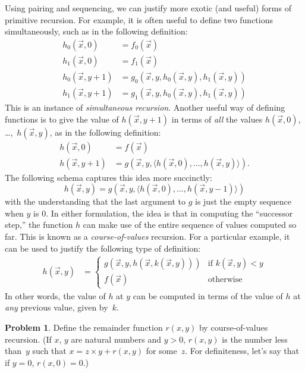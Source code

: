 \documentclass[10pt,a4paper]{article}
\theoremstyle{plain}
\theoremstyle{definition}
\newtheorem{prob}{Problem}[section]
\theoremstyle{remark}
\providecommand{\tuple}[1]{\langle #1 \rangle}
\begin{document}
Using pairing and sequencing, we can justify more exotic (and
useful) forms of primitive recursion. For example, it is often useful
to define two functions simultaneously, such as in the following
definition:
\begin{align*}
h_0(\vec x, 0) & = f_0(\vec x) \\
h_1(\vec x, 0) & = f_1(\vec x) \\
h_0(\vec x, y+1) & = g_0(\vec x, y, h_0(\vec x, y), h_1(\vec x, y)) \\
h_1(\vec x, y+1) & = g_1(\vec x, y, h_0(\vec x, y), h_1(\vec x, y))
\end{align*}
This is an instance of \emph{simultaneous recursion}. Another useful
way of defining functions is to give the value of $h(\vec x, y+1)$ in
terms of \emph{all} the values $h(\vec x, 0)$, \dots,~$h(\vec x, y)$, as in
the following definition:
\begin{align*}
h(\vec x, 0) & = f(\vec x) \\
h(\vec x, y+1) & = g(\vec x, y, \tuple{h(\vec x, 0), \dots, h(\vec x, y)}).
\end{align*}
The following schema captures this idea more succinctly:
\[
h(\vec x, y) = g(\vec x, y, \tuple{h(\vec x, 0), \dots, h(\vec x, y-1)})
\]
with the understanding that the last argument to $g$ is just the
empty sequence when $y$ is $0$. In either formulation, the idea is
that in computing the ``successor step,'' the function $h$ can make
use of the entire sequence of values computed so far.
This is known as a \emph{course-of-values} recursion. For a particular
example, it can be used to justify the following type of definition:
\begin{align*}
h(\vec x, y) & = \begin{cases}
  g(\vec x, y, h(\vec x, k(\vec x, y))) & \text{if $k(\vec x, y) < y$} \\
  f(\vec x) & \text{otherwise}
\end{cases}
\end{align*}
In other words, the value of $h$ at $y$ can be computed in terms of
the value of $h$ at \emph{any} previous value, given by~$k$.


\begin{prob}
  Define the remainder function $r(x,y)$ by course-of-values
  recursion. (If $x$, $y$ are natural numbers and $y > 0$, $r(x,y)$ is
  the number less than~$y$ such that $x = z\times y + r(x,y)$ for
  some~$z$. For definiteness, let's say that if $y=0$, $r(x,0) = 0$.)
\end{prob}
\end{document}
